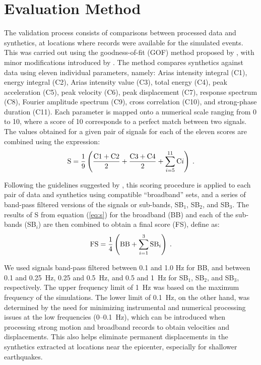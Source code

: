 
\section{Evaluation Method}

The validation process consists of comparisons between processed data and synthetics, at locations where records were available for the simulated events. This was carried out using the goodness-of-fit (GOF) method proposed by \citet{Anderson_2004_Proc}, with minor modifications introduced by \citet{Taborda_2013_BSSA}. The method compares synthetics against data using eleven individual parameters, namely: Arias intensity integral (C1), energy integral (C2), Arias intensity value (C3), total energy (C4), peak acceleration (C5), peak velocity (C6), peak displacement (C7), response spectrum (C8), Fourier amplitude spectrum (C9), cross correlation (C10), and strong-phase duration (C11). Each parameter is mapped onto a numerical scale ranging from 0 to 10, where a score of 10 corresponds to a perfect match between two signals. The values obtained for a given pair of signals for each of the eleven scores are combined using the expression: 
%
\begin{equation}
	\mathrm{S} = \frac{1}{9} \left( 
		\frac{\mathrm{C}1+\mathrm{C}2}{2} +
		\frac{\mathrm{C}3+\mathrm{C}4}{2} +
		\sum_{i=5}^{11} \mathrm{C}i
	\right)
	\hspace{0.25em}.
	\label{eq:s}
\end{equation}

Following the guidelines suggested by \citet{Anderson_2004_Proc}, this scoring procedure is applied to each pair of data and synthetics using compatible ``broadband'' sets, and a series of band-pass filtered versions of the signals or sub-bands, SB$_1$, SB$_2$, and SB$_3$. The results of S from equation (\ref{eq:s}) for the broadband (BB) and each of the sub-bands (SB$_i$) are then combined to obtain a final score (FS), define as:
%
\begin{equation}
	\mathrm{FS} = \frac{1}{4} \left( \mathrm{BB} + \sum^3_{i=1} \mathrm{SB}_i \right)
	\hspace{0.25em}.
	\label{eq:fs}
\end{equation}

We used signals band-pass filtered between 0.1 and 1.0 Hz for BB, and between 0.1 and 0.25~Hz, 0.25 and 0.5~Hz, and 0.5 and 1~Hz for SB$_1$, SB$_2$, and SB$_3$, respectively. The upper frequency limit of 1~Hz was based on the maximum frequency of the simulations. The lower limit of 0.1~Hz, on the other hand, was determined by the need for minimizing instrumental and numerical processing issues at the low frequencies (0--0.1~Hz), which can be introduced when processing strong motion and broadband records to obtain velocities and displacements. This also helps eliminate permanent displacements in the synthetics extracted at locations near the epicenter, especially for shallower earthquakes. 

